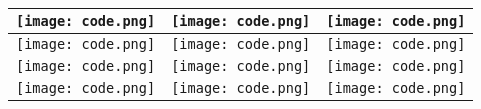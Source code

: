 \documentclass{article}
\begin{document}
\begin{center}
  \begin{tabular}{ |c|c|c| }
    \hline
    \texttt{[image: code.png]} &  \texttt{[image: code.png]} & \texttt{[image: code.png]} \\
    \hline
    \texttt{[image: code.png]} &  \texttt{[image: code.png]} & \texttt{[image: code.png]} \\
    \hline
    \texttt{[image: code.png]} &  \texttt{[image: code.png]} & \texttt{[image: code.png]} \\
    \hline
    \texttt{[image: code.png]} &  \texttt{[image: code.png]} & \texttt{[image: code.png]} \\
    \hline
  \end{tabular}
\end{center}
\end{document}
